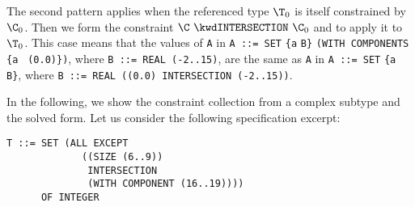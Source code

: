 The second pattern applies when the referenced type $\T_0$ is itself
constrained by $\C_0$. Then we form the constraint $\C \,\,
\kwdINTERSECTION \,\, \C_0$ and to apply it to $\T_0$. This case means
that the values of \texttt{\small A} in \texttt{\small A ::= SET}
\verb+{+\texttt{a} \texttt{\small B}\verb+}+ \texttt{\small (WITH
  COM\-PO\-NENTS} \verb+{+\texttt{a} \texttt{\small
  (0.0)}\verb+}+\texttt{\small )}, where \texttt{\small B ::= REAL
  (-2..15)}, are the same as \texttt{\small A} in \texttt{\small A ::=
  SET} \verb+{+\texttt{a} \texttt{\small B}\verb+}+, where
\texttt{\small B ::= REAL ((0.0) INTERSECTION (-2..15))}.

In the following, we show the constraint collection from a complex
subtype and the solved form.\label{subtype_example} Let us consider
the following specification excerpt:\\

\begin{verbatim}
T ::= SET (ALL EXCEPT 
             ((SIZE (6..9))
              INTERSECTION 
              (WITH COMPONENT (16..19))))
      OF INTEGER
\end{verbatim}

